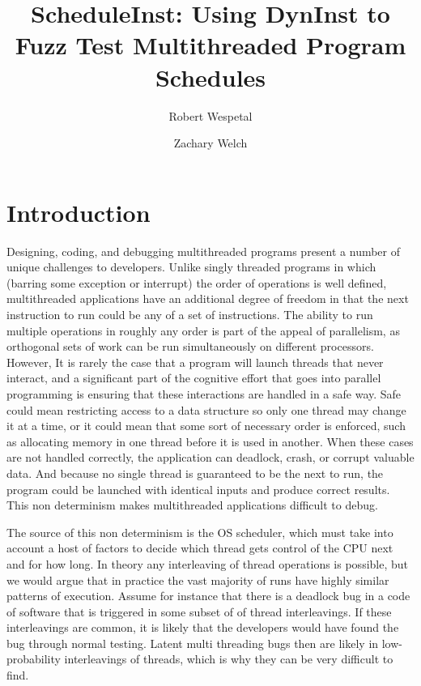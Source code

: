 \documentclass[10pt,]{article} %
\title{ScheduleInst: Using DynInst to Fuzz Test Multithreaded Program Schedules}
\author{Robert Wespetal\\
\and
Zachary Welch}
\begin{document}
\setlength{\baselineskip}{18pt}

\maketitle

\begin{abstract}
\setlength{\baselineskip}{18pt}

 \end{abstract}


\section{Introduction}

Designing, coding, and debugging multithreaded programs present a number of unique challenges to developers. Unlike singly threaded programs in which (barring some exception or interrupt) the order of operations is well defined, multithreaded applications have an additional degree of freedom in that the next instruction to run could be any of a set of instructions.  The ability to run multiple operations in roughly any order is part of the appeal of parallelism, as orthogonal sets of work can be run simultaneously on different processors.  However, It is rarely the case that a program will launch threads that never interact, and a significant part of the cognitive effort that goes into parallel programming is ensuring that these interactions are handled in a safe way. Safe could mean restricting access to a data structure so only one thread may change it at a time, or it could mean that some sort of necessary order is enforced, such as allocating memory in one thread before it is used in another.  When these cases are not handled correctly, the application can deadlock, crash, or corrupt valuable data.  And because no single thread is guaranteed to be the next to run, the program could be launched with identical  inputs and produce correct results.  This non determinism makes multithreaded applications difficult to debug.



	The source of this non determinism is the OS scheduler, which must take into account a host of factors to decide which thread gets control of the CPU next and for how long.  In theory any interleaving of thread operations is possible, but we would argue that in practice the vast majority of runs have highly similar patterns of execution.  Assume for instance that there is a deadlock bug in a code of software that is triggered in some subset of of thread interleavings. If these interleavings are common, it is likely that the developers would have found the bug through normal testing.  Latent multi threading bugs then are likely in low-probability interleavings of threads, which is why they can be very difficult to find.   
\end{document}
